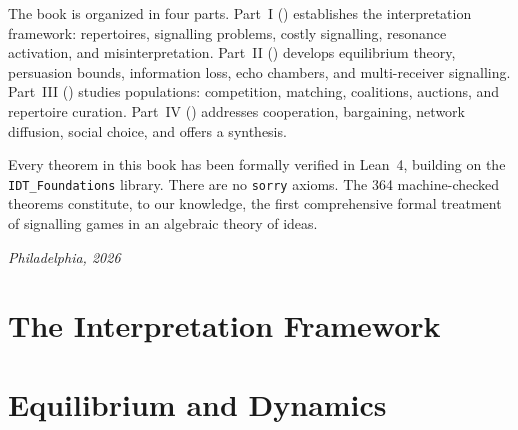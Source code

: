 \documentclass[11pt,twoside]{book}
\theoremstyle{plain}
\theoremstyle{definition}
\theoremstyle{remark}
\begin{document}
The book is organized in four parts. Part~I ()
establishes the interpretation framework: repertoires, signalling problems,
costly signalling, resonance activation, and misinterpretation. Part~II
()
develops equilibrium theory, persuasion bounds, information loss, echo
chambers, and multi-receiver signalling. Part~III
()
studies populations: competition, matching, coalitions, auctions, and
repertoire curation. Part~IV
()
addresses cooperation, bargaining, network diffusion, social choice,
and offers a synthesis.

Every theorem in this book has been formally verified in Lean~4,
building on the \texttt{IDT\_Foundations} library. There are no
\texttt{sorry} axioms. The 364 machine-checked theorems constitute,
to our knowledge, the first comprehensive formal treatment of signalling
games in an algebraic theory of ideas.

\vspace{1cm}
\noindent\textit{Philadelphia, 2026}

\tableofcontents

\mainmatter

\part{The Interpretation Framework}
\label{part:interpretation}







\part{Equilibrium and Dynamics}
\label{part:equilibrium}







\end{document}

